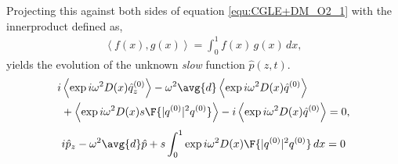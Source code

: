 Projecting this against both sides of equation \eqref{equ:CGLE+DM_O2_1} with the innerproduct defined as,
\begin{equation}\label{equ:Innerproduct}
\begin{split}
\left<f(x),g(x)\right> = \int_{0}^{1} f(x)\,g(x) \,dx,
\end{split}
\end{equation}
yields the evolution of the unknown \textit{slow} function $\hat{p}(z,t)$.
\begin{equation}
\begin{split}
i &\left<\exp{i \omega^2 D(x)} \hat{q}^{(0)}_z\right> - \omega^2 \avg{d} \left<\exp{i \omega^2 D(x)} \hat{q}^{(0)}\right> \\
&+ \left<\exp{i \omega^2 D(x)} s \F{|q^{(0)}|^2 q^{(0)}}\right> - i \left<\exp{i \omega^2 D(x)}  \hat{q}^{(0)}\right>  = 0,\\
\end{split}
\end{equation}
\begin{equation}
\begin{split}
i &\hat{p}_z - \omega^2 \avg{d} \hat{p} + s \int_{0}^{1}\exp{i \omega^2 D(x)}  \F{|q^{(0)}|^2 q^{(0)}}\,dx  = 0\\
\end{split}
\end{equation}
